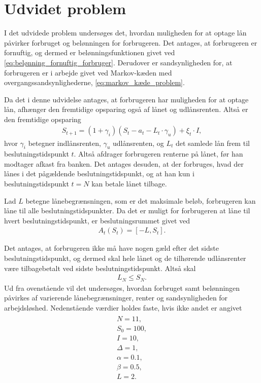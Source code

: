 \section{Udvidet problem}
I det udvidede problem undersøges det, hvordan muligheden for at optage lån påvirker forbruget og belønningen for forbrugeren. Det antages, at forbrugeren er fornuftig, og dermed er belønningsfunktionen givet ved \eqref{eq:belønning_fornuftig_forbruger}. Derudover er sandsynligheden for, at forbrugeren er i arbejde givet ved Markov-kæden med overgangssandsynlighederne, \eqref{eq:markov_kæde_problem}.

Da det i denne udvidelse antages, at forbrugeren har muligheden for at optage lån, afhænger den fremtidige opsparing også af lånet og udlånsrenten. Altså er den fremtidige opsparing 
\begin{align*} 
    S_{t+1} =(1 + \gamma_i)(S_t-a_t - L_t \cdot \gamma_u) + \xi_t \cdot I,
\end{align*}
hvor $\gamma_i$ betegner indlånsrenten, $\gamma_u$ udlånsrenten, og $L_t$ det samlede lån frem til beslutningstidspunkt $t$. Altså afdrager forbrugeren renterne på lånet, før han modtager afkast fra banken. 
Det antages desuden, at der forbruges, hvad der lånes i det pågældende beslutningstidspunkt, og at han kun i beslutningstidspunkt $t=N$ kan betale lånet tilbage. 

Lad $L$ betegne lånebegrænsningen, som er det maksimale beløb, forbrugeren kan låne til alle beslutningstidspunkter. Da det er muligt for forbrugeren at låne til hvert beslutningstidspunkt, er beslutningsrummet givet ved
\begin{align*}
    A_t(S_t) = [-L, S_t].
\end{align*}

Det antages, at forbrugeren ikke må have nogen gæld efter det sidste beslutningstidspunkt, og dermed skal hele lånet og de tilhørende udlånsrenter være tilbagebetalt ved sidste beslutningstidspunkt. Altså skal
\begin{align*}
    L_N \leq S_N.
\end{align*}
Ud fra ovenstående vil det undersøges, hvordan forbruget samt belønningen påvirkes af varierende lånebegrænsninger, renter og sandsynligheden for arbejdsløshed. Nedenstående værdier holdes faste, hvis ikke andet er angivet
\begin{align}\label{fastevariable}
    \begin{split}
        N=11,\\
        S_0 = 100,\\
        I=10,\\
        \Delta = 1,\\
        \alpha = 0.1, \\
        \beta = 0.5,\\
        L = 2.\
    \end{split}
\end{align}


